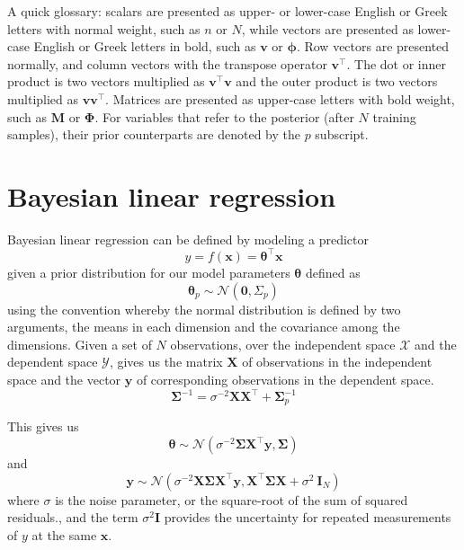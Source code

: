 \documentclass{article}
\begin{document}
A quick glossary: scalars are presented as upper- or lower-case English or Greek letters with normal weight, such as $n$ or $N$, while vectors are presented as lower-case English or Greek letters in bold, such as $\mathbf{v}$ or $\boldsymbol{\phi}$. Row vectors are presented normally, and column vectors with the transpose operator $\mathbf{v}^\top$. The dot or inner product is two vectors multiplied as $\mathbf{v}^\top \mathbf{v}$ and the outer product is two vectors multiplied as $\mathbf{v} \mathbf{v}^\top$. Matrices are presented as upper-case letters with bold weight, such as $\mathbf{M}$ or $\boldsymbol{\Phi}$. For variables that refer to the posterior (after $N$ training samples), their prior counterparts are denoted by the $p$ subscript.

\section{Bayesian linear regression}

Bayesian linear regression can be defined by modeling a predictor
\begin{equation}
    y=f(\mathbf{x})=\boldsymbol{\theta}^\top\mathbf{x}
\end{equation} 
given a prior distribution for our model parameters $\boldsymbol{\theta}$ defined as 
\begin{equation}
    \boldsymbol{\theta}_p \sim \mathcal{N}(\mathbf{0},\Sigma_p)
\end{equation} 
using the convention whereby the normal distribution is defined by two arguments, the means in each dimension and the covariance among the dimensions. Given a set of $N$ observations, over the independent space $\mathcal{X}$ and the dependent space $\mathcal{Y}$, gives us the matrix $\mathbf{X}$ of observations in the independent space and the vector $\mathbf{y}$ of corresponding observations in the dependent space.
\begin{equation}
    \boldsymbol{\Sigma}^{-1} = \sigma^{-2}\mathbf{XX}^\top + \boldsymbol{\Sigma}_p^{-1}
\end{equation}

This gives us
\begin{equation}
    \boldsymbol{\theta}\sim\mathcal{N}( \sigma^{-2}\boldsymbol{\Sigma} \mathbf{X}^\top \mathbf{y},\boldsymbol{\Sigma})
\end{equation} 
and
\begin{equation}
    \mathbf{y}\sim\mathcal{N}\left(\sigma^{-2}\mathbf{X}  \boldsymbol{\Sigma} \mathbf{X}^\top \mathbf{y} ,\mathbf{X}^\top \boldsymbol{\Sigma} \mathbf{X} +\sigma^2\ \mathbf{I}_N\right)
\end{equation} 
where $\sigma$ is the noise parameter, or the square-root of the sum of squared residuals., and the term $\sigma^2 \mathbf{I}$ provides the uncertainty for repeated measurements of $y$ at the same $\mathbf{x}$.
\end{document}
